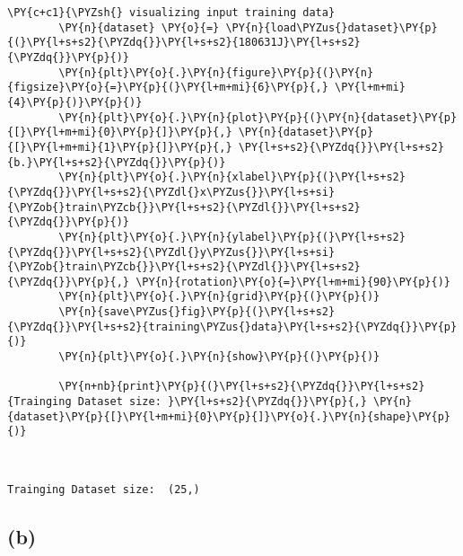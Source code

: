 \documentclass[a4paper,11pt]{article}%
\begin{document}
\begin{tcolorbox}[breakable, size=fbox, boxrule=1pt, pad at break*=1mm,colback=cellbackground, colframe=cellborder]
	\begin{Verbatim}[commandchars=\\\{\}]
		\PY{c+c1}{\PYZsh{} visualizing input training data}
		\PY{n}{dataset} \PY{o}{=} \PY{n}{load\PYZus{}dataset}\PY{p}{(}\PY{l+s+s2}{\PYZdq{}}\PY{l+s+s2}{180631J}\PY{l+s+s2}{\PYZdq{}}\PY{p}{)}
		\PY{n}{plt}\PY{o}{.}\PY{n}{figure}\PY{p}{(}\PY{n}{figsize}\PY{o}{=}\PY{p}{(}\PY{l+m+mi}{6}\PY{p}{,} \PY{l+m+mi}{4}\PY{p}{)}\PY{p}{)}
		\PY{n}{plt}\PY{o}{.}\PY{n}{plot}\PY{p}{(}\PY{n}{dataset}\PY{p}{[}\PY{l+m+mi}{0}\PY{p}{]}\PY{p}{,} \PY{n}{dataset}\PY{p}{[}\PY{l+m+mi}{1}\PY{p}{]}\PY{p}{,} \PY{l+s+s2}{\PYZdq{}}\PY{l+s+s2}{b.}\PY{l+s+s2}{\PYZdq{}}\PY{p}{)}
		\PY{n}{plt}\PY{o}{.}\PY{n}{xlabel}\PY{p}{(}\PY{l+s+s2}{\PYZdq{}}\PY{l+s+s2}{\PYZdl{}x\PYZus{}}\PY{l+s+si}{\PYZob{}train\PYZcb{}}\PY{l+s+s2}{\PYZdl{}}\PY{l+s+s2}{\PYZdq{}}\PY{p}{)}
		\PY{n}{plt}\PY{o}{.}\PY{n}{ylabel}\PY{p}{(}\PY{l+s+s2}{\PYZdq{}}\PY{l+s+s2}{\PYZdl{}y\PYZus{}}\PY{l+s+si}{\PYZob{}train\PYZcb{}}\PY{l+s+s2}{\PYZdl{}}\PY{l+s+s2}{\PYZdq{}}\PY{p}{,} \PY{n}{rotation}\PY{o}{=}\PY{l+m+mi}{90}\PY{p}{)}
		\PY{n}{plt}\PY{o}{.}\PY{n}{grid}\PY{p}{(}\PY{p}{)}
		\PY{n}{save\PYZus{}fig}\PY{p}{(}\PY{l+s+s2}{\PYZdq{}}\PY{l+s+s2}{training\PYZus{}data}\PY{l+s+s2}{\PYZdq{}}\PY{p}{)}
		\PY{n}{plt}\PY{o}{.}\PY{n}{show}\PY{p}{(}\PY{p}{)}
		
		\PY{n+nb}{print}\PY{p}{(}\PY{l+s+s2}{\PYZdq{}}\PY{l+s+s2}{Trainging Dataset size: }\PY{l+s+s2}{\PYZdq{}}\PY{p}{,} \PY{n}{dataset}\PY{p}{[}\PY{l+m+mi}{0}\PY{p}{]}\PY{o}{.}\PY{n}{shape}\PY{p}{)}
	\end{Verbatim}
\end{tcolorbox}

\begin{center}
\end{center}
{ \hspace*{\fill} \\}

\begin{Verbatim}[commandchars=\\\{\}]
	Trainging Dataset size:  (25,)
\end{Verbatim}

\hypertarget{b}{%
	\subsection{(b)}\label{b}}
\end{document}
